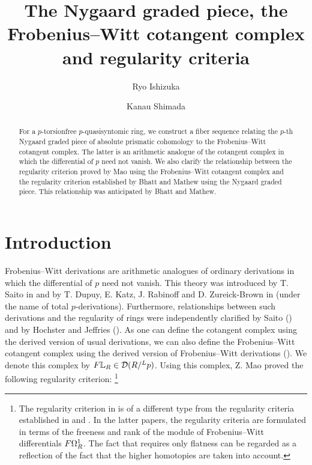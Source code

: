 \documentclass[11pt,a4paper]{amsart}
\title[Nygaard grading, Frobenius--Witt, and regularity]{The Nygaard graded piece, the Frobenius--Witt cotangent complex and regularity criteria}
\author[R. Ishizuka]{Ryo Ishizuka}
\author[K. Shimada]{Kanau Shimada}
\begin{document}
\begin{abstract}
For a \(p\)-torsionfree \(p\)-quasisyntomic ring, we construct a fiber sequence relating the \(p\)-th Nygaard graded piece of absolute prismatic cohomology to the Frobenius--Witt cotangent complex. The latter is an arithmetic analogue of the cotangent complex in which the differential of $p$ need not vanish. We also clarify the relationship between the regularity criterion proved by Mao using the Frobenius--Witt cotangent complex and the regularity criterion established by Bhatt and Mathew using the Nygaard graded piece. This relationship was anticipated by Bhatt and Mathew.
\end{abstract}

\maketitle 

\setcounter{tocdepth}{1}
\tableofcontents
\section{Introduction}
Frobenius--Witt derivations are arithmetic analogues of ordinary derivations in which the differential of $p$ need not vanish.
This theory was introduced by T. Saito in \cite{saito2022Frobenius} and by T. Dupuy, E. Katz, J. Rabinoff and D. Zureick-Brown in \cite{dupuy2019Total} (under the name of total $p$-derivations). Furthermore, relationships between such derivations and the regularity of rings were independently clarified by Saito (\cite[Theorem 3.4]{saito2022Frobenius}) and by Hochster and Jeffries (\cite[Corollary 5.10]{HochsterJefferies24}). As one can define the cotangent complex using the derived version of usual derivations, we can also define the Frobenius--Witt cotangent complex using the derived version of Frobenius--Witt derivations (\cite{shimada2026FrobeniusWitt}). We denote this complex by $F\mathbb{L}_R\in \mathcal{D}(R/^Lp)$. Using this complex, Z. Mao proved the following regularity criterion:
\footnote{The regularity criterion in \cite[Theorem 5.2]{mao2026FrobeniusWitt} is of a different type from the regularity criteria established in \cite{saito2022Frobenius} and \cite{HochsterJefferies24}. In the latter papers, the regularity criteria are formulated in terms of the freeness and rank of the module of Frobenius--Witt differentials \(F\Omega_R^1\). The fact that \cite[Theorem 5.2]{mao2026FrobeniusWitt} requires only flatness can be regarded as a reflection of the fact that the higher homotopies are taken into account.} 
\end{document}
